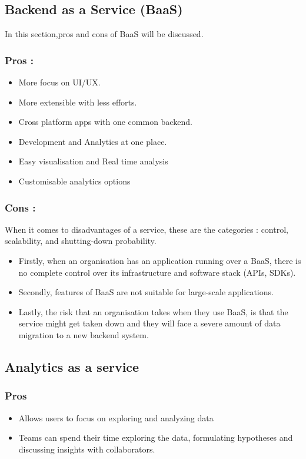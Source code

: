 \documentclass[a4paper,12pt]{report}
\begin{document}
    \subsection{Backend as a Service (BaaS)}
    In this section,pros and cons of BaaS will be discussed. \\
    \subsubsection{Pros :}
    \begin{itemize}
      \item More focus on UI/UX.
      \item More extensible with less efforts.
      \item Cross platform apps with one common backend.
      \item Development and Analytics at one place.
      \item Easy visualisation and Real time analysis      
      \item Customisable analytics options      
      \end{itemize}
      \subsubsection{Cons :} 
      When it comes to disadvantages of a service, these are the categories :  control, scalability, and shutting-down probability. 
      \begin{itemize}
        \item Firstly, when an organisation has an application running over a BaaS, there is no complete control over its infrastructure and software stack (APIs, SDKs). 
        \item Secondly, features of BaaS are not suitable for large-scale applications. 
        \item Lastly, the risk that an organisation takes when they use BaaS, is that the service might get taken down and they will face a severe amount of data migration to a new backend system.
      \end{itemize}   
    
    \subsection{Analytics as a service}
    \subsubsection{Pros}
    \begin{itemize}
      \item Allows users to focus on exploring and analyzing data      
      \item Teams can spend their time exploring the data, formulating hypotheses and discussing insights with collaborators.      
    \end{itemize}
    
\end{document}

